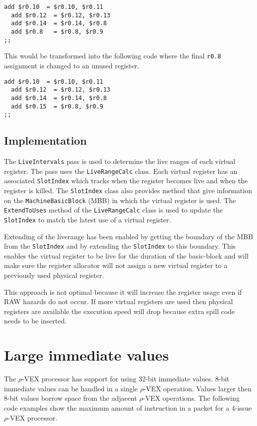 \begin{lstlisting}[language=rvex]
  add $r0.10  = $r0.10, $r0.11
  add $r0.12  = $r0.12, $r0.13
  add $r0.14  = $r0.14, $r0.8
  add $r0.8   = $r0.8, $r0.9
;;
\end{lstlisting}

This would be transformed into the following code where the final \texttt{r0.8} assignment is changed to an unused register. 

\begin{lstlisting}[language=rvex]
  add $r0.10  = $r0.10, $r0.11
  add $r0.12  = $r0.12, $r0.13
  add $r0.14  = $r0.14, $r0.8
  add $r0.15  = $r0.8, $r0.9
;;
\end{lstlisting}

\subsection{Implementation} %
\label{sub:implementation}
The \texttt{LiveIntervals} pass is used to determine the live ranges of each virtual register. The pass uses the \texttt{LiveRangeCalc} class.
Each virtual register has an associated \texttt{SlotIndex} which tracks when the register becomes live and when the register is killed. The \texttt{SlotIndex} class also provides method that give information on the \texttt{MachineBasicBlock} (MBB) in which the virtual register is used. The \texttt{ExtendToUses} method of the \texttt{LiveRangeCalc} class is used to update the \texttt{SlotIndex} to match the latest use of a virtual register. 

Extending of the liverange has been enabled by getting the boundary of the MBB from the \texttt{SlotIndex} and by extending the \texttt{SlotIndex} to this boundary. This enables the virtual register to be live for the duration of the basic-block and will make sure the register allocator will not assign a new virtual register to a previously used physical register.

This approach is not optimal because it will increase the register usage even if RAW hazards do not occur. If more virtual registers are used then physical registers are available the execution speed will drop because extra spill code needs to be inserted.

\section{Large immediate values}
The $\rho$-VEX processor has support for using 32-bit immediate values. 8-bit immediate values can be handled in a single $\rho$-VEX operation. Values larger then 8-bit values borrow space from the adjacent $\rho$-VEX operations. The following code examples show the maximum amount of instruction in a packet for a 4-issue $\rho$-VEX processor.

